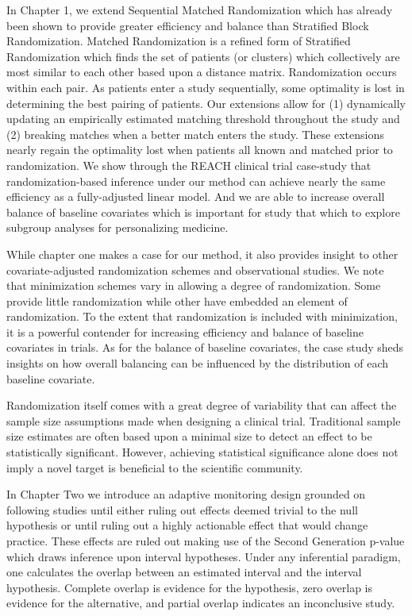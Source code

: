 \documentclass[12pt,oneside]{book}
\newlength{\li}\setlength{\li}{14.48pt}
\newlength{\di}\setlength{\di}{-3.5mm}
\theoremstyle{definition}
\theoremstyle{definition}
\theoremstyle{definition}
\theoremstyle{remark}
\begin{document}
In Chapter 1, we extend Sequential Matched Randomization which has
already been shown to provide greater efficiency and balance than
Stratified Block Randomization. Matched Randomization is a refined form
of Stratified Randomization which finds the set of patients (or
clusters) which collectively are most similar to each other based upon a
distance matrix. Randomization occurs within each pair. As patients
enter a study sequentially, some optimality is lost in determining the
best pairing of patients. Our extensions allow for (1) dynamically
updating an empirically estimated matching threshold throughout the
study and (2) breaking matches when a better match enters the study.
These extensions nearly regain the optimality lost when patients all
known and matched prior to randomization. We show through the REACH
clinical trial case-study that randomization-based inference under our
method can achieve nearly the same efficiency as a fully-adjusted linear
model. And we are able to increase overall balance of baseline
covariates which is important for study that which to explore subgroup
analyses for personalizing medicine.

While chapter one makes a case for our method, it also provides insight
to other covariate-adjusted randomization schemes and observational
studies. We note that minimization schemes vary in allowing a degree of
randomization. Some provide little randomization while other have
embedded an element of randomization. To the extent that randomization
is included with minimization, it is a powerful contender for increasing
efficiency and balance of baseline covariates in trials. As for the
balance of baseline covariates, the case study sheds insights on how
overall balancing can be influenced by the distribution of each baseline
covariate.

Randomization itself comes with a great degree of variability that can
affect the sample size assumptions made when designing a clinical trial.
Traditional sample size estimates are often based upon a minimal size to
detect an effect to be statistically significant. However, achieving
statistical significance alone does not imply a novel target is
beneficial to the scientific community.

In Chapter Two we introduce an adaptive monitoring design grounded on
following studies until either ruling out effects deemed trivial to the
null hypothesis or until ruling out a highly actionable effect that
would change practice. These effects are ruled out making use of the
Second Generation p-value which draws inference upon interval
hypotheses. Under any inferential paradigm, one calculates the overlap
between an estimated interval and the interval hypothesis. Complete
overlap is evidence for the hypothesis, zero overlap is evidence for the
alternative, and partial overlap indicates an inconclusive study.
\end{document}
